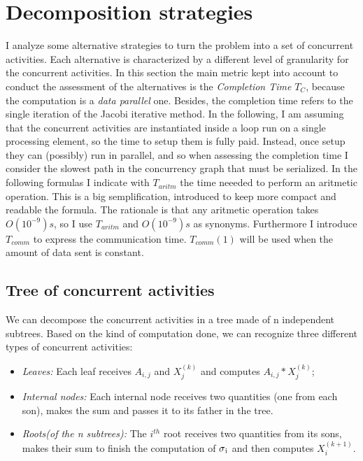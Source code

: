 \documentclass{article}
\begin{document}
\section{Decomposition strategies}
I analyze some alternative strategies to turn the problem into a set of concurrent activities. Each alternative is characterized by a different level of granularity for the concurrent activities. In this section the main metric kept into account to conduct the assessment of the alternatives is the \textit{Completion Time} $T_{C}$, because the computation is a \textit{data parallel} one. Besides, the completion time refers to the single iteration of the Jacobi iterative method. In the following, I am assuming that the concurrent activities are instantiated inside a loop run on a single processing element, so the time to setup them is fully paid. Instead, once setup they can (possibly) run in parallel, and so when assessing the completion time I consider the slowest path in the concurrency graph that must be serialized. In the following formulas I indicate with $T_{aritm}$ the time neeeded to perform an aritmetic operation. This is a big semplification, introduced to keep more compact and readable the formula. The rationale is that any aritmetic operation takes $O(10^{-9})s$, so I use $T_{aritm}$ and $O(10^{-9})s$ as synonyms. Furthermore I introduce $T_{comm}$ to express the communication time. $T_{comm}(1)$ will be used when the amount of data sent is constant.    

\subsection{Tree of concurrent activities}
We can decompose the concurrent activities in a tree made of n independent subtrees. Based on the kind of computation done, we can recognize three different types of concurrent activities: 
\begin{itemize}
\item \textit{Leaves:} Each leaf receives $A_{i,j}$ and $X_{j}^{(k)}$ and computes $A_{i,j} * X_{j}^{(k)}$; 
\item \textit{Internal nodes:} Each internal node receives two quantities (one from each son), makes the sum and passes it to its father in the tree. 
\item \textit{Roots(of the n subtrees):} The $i^{th}$ root receives two quantities from its sons, makes their sum to finish the computation of $\sigma\textsubscript{i}$ and then computes $X_{i}^{(k+1)}$.    
\end{itemize}
\end{document}
